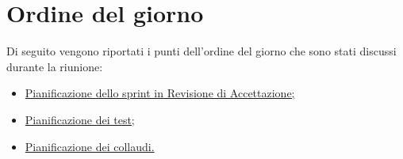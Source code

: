 \clearpage
\section{Ordine del giorno}
Di seguito vengono riportati i punti dell’ordine del giorno che sono stati discussi durante la riunione:
\begin{itemize}
	\item \hyperref[sec:sprint]{Pianificazione dello sprint in Revisione di Accettazione;}
	\item \hyperref[sec:test]{Pianificazione dei test;}
	\item \hyperref[sec:collaudi]{Pianificazione dei collaudi.}
\end{itemize}